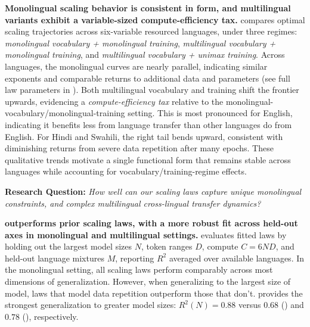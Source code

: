 \noindent\textbf{Monolingual scaling behavior is consistent in form, and multilingual variants exhibit a variable-sized compute-efficiency tax.}
 compares optimal scaling trajectories across six-variable resourced languages, under three regimes: \emph{monolingual vocabulary + monolingual training}, \emph{multilingual vocabulary + monolingual training}, and \emph{multilingual vocabulary + unimax training}.
Across languages, the monolingual curves are nearly parallel, indicating similar exponents and comparable returns to additional data and parameters (see full law parameters in ).
Both multilingual vocabulary and \unimax{} training shift the frontier upwards, evidencing a \emph{compute-efficiency tax} relative to the monolingual-vocabulary/monolingual-training setting.
This is most pronounced for English, indicating it benefits less from language transfer than other languages do from English.
For Hindi and Swahili, the right tail bends upward, consistent with diminishing returns from severe data repetition after many epochs.
These qualitative trends motivate a single functional form that remains stable across languages while accounting for vocabulary/training-regime effects.

\noindent\textbf{Research Question:} \emph{How well can our scaling laws capture unique monolingual constraints, and complex multilingual cross-lingual transfer dynamics?}

\noindent\textbf{\oursclabb{} outperforms prior scaling laws, with a more robust fit across held-out axes in monolingual and multilingual settings.}
 evaluates fitted laws by holding out the largest model sizes \(N\), token ranges \(D\), compute \(C=6ND\), and held-out language mixtures $M$, reporting \(R^2\) averaged over available languages.
In the monolingual setting, all scaling laws perform comparably across most dimensions of generalization.
However, when generalizing to the largest size of model, laws that model data repetition outperform those that don't.
\oursclabb{} provides the strongest generalization to greater model sizes: \(R^2(N)=\mathbf{0.88}\) versus \(0.68\) (\basicsclabb{}) and \(0.78\) (\dcslabb{}), respectively.

